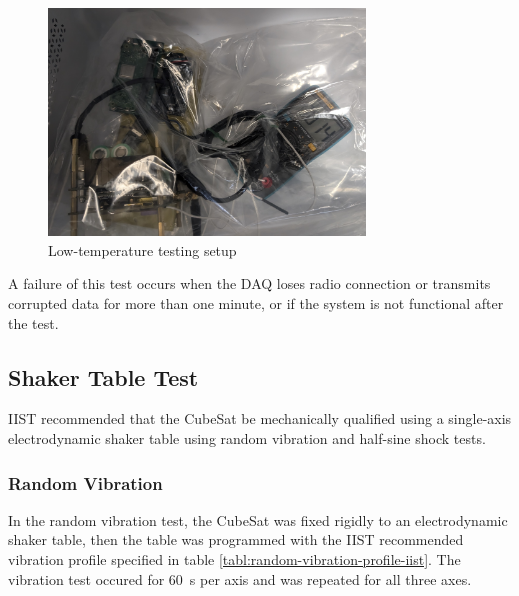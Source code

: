 \documentclass{report}
\begin{document}
\begin{figure}[H]
  \centering
  \includegraphics[width=0.75\textwidth]{images/fridge_test.jpg}
  \caption{Low-temperature testing setup}
\end{figure}

A failure of this test occurs when the DAQ loses radio connection or transmits corrupted data for more than one minute, or if the system is not functional after the test.

\subsection{Shaker Table Test}
\label{sec:shaker-table-test}

IIST recommended that the CubeSat be mechanically qualified using a single-axis electrodynamic shaker table using random vibration and half-sine shock tests.

\subsubsection{Random Vibration}

In the random vibration test, the CubeSat was fixed rigidly to an electrodynamic shaker table, then the table was programmed with the IIST recommended vibration profile specified in table \ref{tabl:random-vibration-profile-iist}. The vibration test occured for \SI{60}{\second} per axis and was repeated for all three axes.
\end{document}
